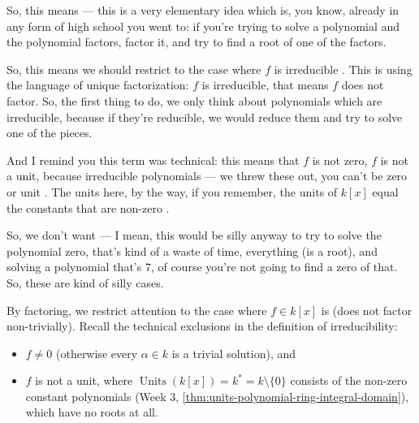 \begin{speech}[00:51:15 - 00:52:35]
So, this means --- this is a very elementary idea which is, you know, already in any form of high school you went to: if you're trying to solve a polynomial and the polynomial factors, factor it, and try to find a root of one of the factors.

So, this means we should restrict to the case where $f$ is irreducible . This is using the language of unique factorization: $f$ is irreducible, that means $f$ does not factor. So, the first thing to do, we only think about polynomials which are irreducible, because if they're reducible, we would reduce them and try to solve one of the pieces.

And I remind you this term  was technical: this means that $f$ is not zero, $f$ is not a unit, because irreducible polynomials --- we threw these out, you can't be zero or unit . The units here, by the way, if you remember, the units of $k[x]$ equal the constants that are non-zero .

So, we don't want --- I mean, this would be silly anyway to try to solve the polynomial zero, that's kind of a waste of time, everything (is a root), and solving a polynomial that's $7$, of course you're not going to find a zero of that. So, these are kind of silly cases.
\end{speech}

\begin{content}
By factoring, we restrict attention to the case where $f \in k[x]$ is  (does not factor non-trivially). Recall the technical exclusions in the definition of irreducibility:
\begin{itemize}
    \item $f \neq 0$ (otherwise every $\alpha \in k$ is a trivial solution), and
    \item $f$ is not a unit, where $\operatorname{Units}(k[x]) = k^* = k \setminus \{0\}$ consists of the non-zero constant polynomials (Week 3, \cref{thm:units-polynomial-ring-integral-domain}), which have no roots at all.
\end{itemize}
\end{content}

